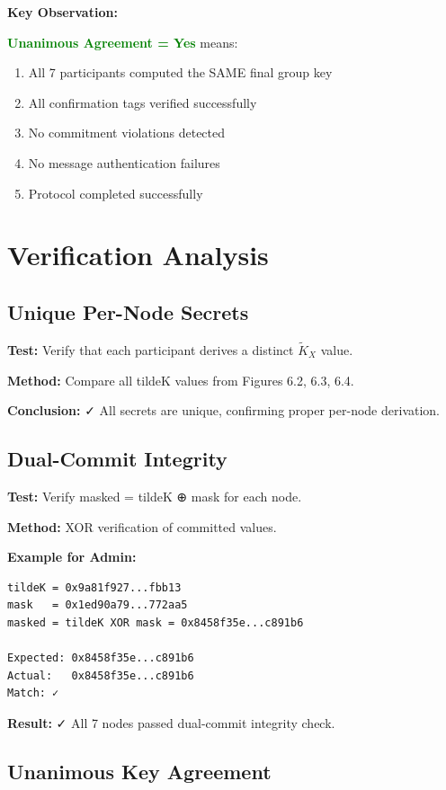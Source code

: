 \documentclass[12pt,a4paper]{report}
\begin{document}
\textbf{Key Observation:}

\textcolor{green}{\textbf{Unanimous Agreement = Yes}} means:
\begin{enumerate}
\item All 7 participants computed the SAME final group key
\item All confirmation tags verified successfully
\item No commitment violations detected
\item No message authentication failures
\item Protocol completed successfully
\end{enumerate}

\section{Verification Analysis}

\subsection{Unique Per-Node Secrets}

\textbf{Test:} Verify that each participant derives a distinct $\widetilde{K}_X$ value.

\textbf{Method:} Compare all tildeK values from Figures 6.2, 6.3, 6.4.



\textbf{Conclusion:} ✓ All secrets are unique, confirming proper per-node derivation.

\subsection{Dual-Commit Integrity}

\textbf{Test:} Verify masked = tildeK ⊕ mask for each node.

\textbf{Method:} XOR verification of committed values.

\textbf{Example for Admin:}

\begin{verbatim}
tildeK = 0x9a81f927...fbb13
mask   = 0x1ed90a79...772aa5
masked = tildeK XOR mask = 0x8458f35e...c891b6

Expected: 0x8458f35e...c891b6
Actual:   0x8458f35e...c891b6
Match: ✓
\end{verbatim}

\textbf{Result:} ✓ All 7 nodes passed dual-commit integrity check.

\subsection{Unanimous Key Agreement}
\end{document}
